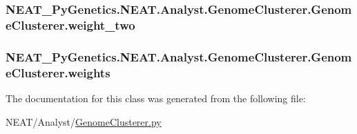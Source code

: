 \subsubsection[{\texorpdfstring{weight\+\_\+two}{weight_two}}]{\setlength{\rightskip}{0pt plus 5cm}N\+E\+A\+T\+\_\+\+Py\+Genetics.\+N\+E\+A\+T.\+Analyst.\+Genome\+Clusterer.\+Genome\+Clusterer.\+weight\+\_\+two\hspace{0.3cm}{\ttfamily [static]}}\hypertarget{classNEAT__PyGenetics_1_1NEAT_1_1Analyst_1_1GenomeClusterer_1_1GenomeClusterer_a2541d20300efb0cff96a18abb6a85d81}{}\label{classNEAT__PyGenetics_1_1NEAT_1_1Analyst_1_1GenomeClusterer_1_1GenomeClusterer_a2541d20300efb0cff96a18abb6a85d81}
\subsubsection[{\texorpdfstring{weights}{weights}}]{\setlength{\rightskip}{0pt plus 5cm}N\+E\+A\+T\+\_\+\+Py\+Genetics.\+N\+E\+A\+T.\+Analyst.\+Genome\+Clusterer.\+Genome\+Clusterer.\+weights\hspace{0.3cm}{\ttfamily [static]}}\hypertarget{classNEAT__PyGenetics_1_1NEAT_1_1Analyst_1_1GenomeClusterer_1_1GenomeClusterer_aff7fba61d7cd8eeeed9149ed48211699}{}\label{classNEAT__PyGenetics_1_1NEAT_1_1Analyst_1_1GenomeClusterer_1_1GenomeClusterer_aff7fba61d7cd8eeeed9149ed48211699}


The documentation for this class was generated from the following file\+:\begin{DoxyCompactItemize}
\item 
N\+E\+A\+T/\+Analyst/\hyperlink{GenomeClusterer_8py}{Genome\+Clusterer.\+py}\end{DoxyCompactItemize}
